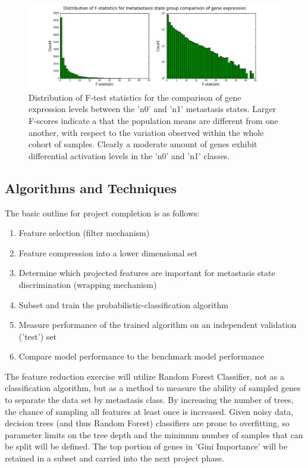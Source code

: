 \documentclass[final]{article}
\begin{document}
\begin{figure}[h!]
  \centering
  \includegraphics[width = \textwidth]{FDist}
  \caption{Distribution of F-test statistics for the comparison of gene expression
  levels between the 'n0' and 'n1' metastasis states.\label{fig:FDist}  Larger F-scores
  indicate a that the population means are different from one another, with respect to the
  variation observed within the whole cohort of samples.  Clearly a moderate amount of
  genes exhibit differential activation levels in the 'n0' and 'n1' classes.}
\end{figure}

\subsection{Algorithms and Techniques}

The basic outline for project completion is as follows:
\begin{enumerate}
\item Feature selection (filter mechanism)
\item Feature compression into a lower dimensional set
\item Determine which projected features are important for metastasis state discrimination (wrapping mechanism)
\item Subset and train the probabilistic-classification algorithm
\item Measure performance of the trained algorithm on an independent validation ('test') set
\item Compare model performance to the benchmark model performance
\end{enumerate}

The feature reduction exercise will utilize Random Forest Classifier, not as a
classification algorithm, but as a method to measure the ability of sampled genes
to separate the data set by metastasis class.  By increasing the number of
trees, the  chance of sampling all features at least once is increased.  Given
noisy data, decision trees (and thus Random Forest) classifiers are prone to
overfitting, so parameter limits on the tree depth and the minimum number of
samples that can be split will be defined. The top portion of genes in 'Gini
Importance' will be retained in a subset and carried into the next project
phase.
\end{document}
